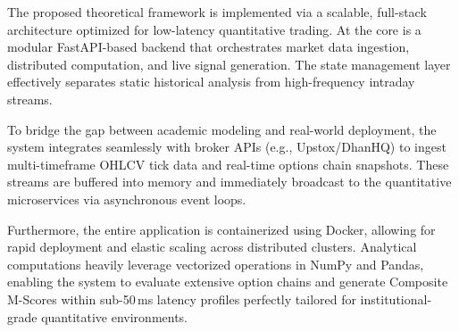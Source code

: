 \documentclass[journal]{IEEEtran}
\begin{document}
The proposed theoretical framework is implemented via a scalable,
full-stack architecture optimized for low-latency quantitative trading.
At the core is a modular FastAPI-based backend that orchestrates market
data ingestion, distributed computation, and live signal generation.
The state management layer effectively separates static historical
analysis from high-frequency intraday streams.

To bridge the gap between academic modeling and real-world deployment,
the system integrates seamlessly with broker APIs (e.g., Upstox/DhanHQ)
to ingest multi-timeframe OHLCV tick data and real-time options chain
snapshots. These streams are buffered into memory and immediately
broadcast to the quantitative microservices via asynchronous event
loops.

Furthermore, the entire application is containerized using Docker,
allowing for rapid deployment and elastic scaling across distributed
clusters. Analytical computations heavily leverage vectorized operations
in NumPy and Pandas, enabling the system to evaluate extensive option
chains and generate Composite M-Scores within sub-50\,ms latency
profiles perfectly tailored for institutional-grade quantitative
environments.
\end{document}
